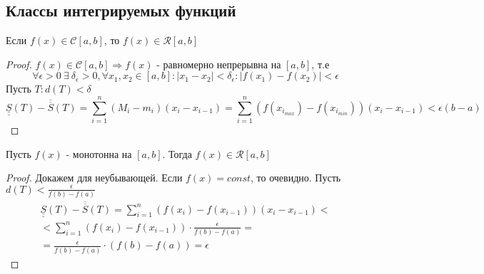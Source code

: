 \subsection{Классы интегрируемых функций}
\begin{theorem}
    Если $f(x)\in \mathcal{C}[a,b]$, то $f(x)\in \mathcal{R}[a,b]$
\end{theorem} 
\begin{proof}
    $f(x)\in \mathcal{C}[a,b] \Rightarrow f(x)$ - равномерно непрерывна на $[a,b]$, т.е
    \[\forall \epsilon>0\ \exists\ \delta_{\epsilon}>0, \forall x_1, x_2\in [a,b]: |x_1-x_2|<\delta_{\epsilon}: |f(x_1)-f(x_2)|<\epsilon\]
    Пусть $T: d(T)<\delta$
    \[\underline{\underline{S}}(T)-\overline{\overline{S}}(T)=\sum\limits_{i=1}^{n}(M_i-m_i)(x_i-x_{i-1})=\sum\limits_{i=1}^{n}(f(x_{i_{max}})-f(x_{i_{min}}))(x_i-x_{i-1})<\epsilon(b-a)\]
\end{proof} 
\begin{theorem}
    Пусть $f(x)$ - монотонна на $[a,b]$. Тогда $f(x)\in \mathcal{R}[a,b]$
\end{theorem} 
\begin{proof}
    Докажем для неубывающей. Если $f(x)=const$, то очевидно.
    Пусть $d(T)<\frac{\epsilon}{f(b)-f(a)}$
    \begin{multline*}
        \underline{\underline{S}}(T)-\overline{\overline{S}}(T)=\sum\limits_{i=1}^{n}(f(x_i)-f(x_{i-1}))(x_i-x_{i-1})<\\
        <\sum\limits_{i=1}^{n}(f(x_i)-f(x_{i-1}))\cdot \frac{\epsilon}{f(b)-f(a)}=\\
        =\frac{\epsilon}{f(b)-f(a)}\cdot (f(b)-f(a))=\epsilon
    \end{multline*}
\end{proof} 
